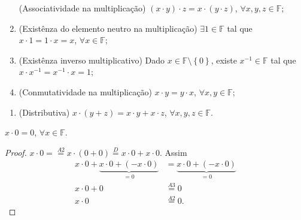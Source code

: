 \begin{definition}[Corpo]
\begin{enumerate}[label={(M\arabic*)},leftmargin=0em,itemindent=*]
		      (Associatividade na multiplicação)
		      $\left(x\cdot y\right)\cdot z=x\cdot\left(y\cdot z\right)$,
		      $\forall x,y,z\in\mathbb{F}$;


		\item\label{multiplicação:2}

		      (Existênza do elemento neutro na multiplicação)
		      $\exists 1\in\mathbb{F}$ tal que $x\cdot 1=1\cdot x=x$,
		      $\forall x\in\mathbb{F}$;

		\item\label{multiplicação:3}

		      (Existênza inverso multiplicativo)
		      Dado $x\in\mathbb{F}\setminus\left\{0\right\}$,
		      existe $x^{-1}\in\mathbb{F}$ tal que
		      $x\cdot x^{-1}=x^{-1}\cdot x=1$;

		\item\label{multiplicação:4}

		      (Conmutatividade na multiplicação)
		      $x\cdot y=y\cdot x$, $\forall x,y\in\mathbb{F}$;
	\end{enumerate}

	\begin{enumerate}[label={(D)},leftmargin=0em,itemindent=*]
		\item\label{distributiva}

		      (Distributiva)
		      $x\cdot\left(y+z\right)=x\cdot y+x\cdot z$,
		      $\forall x,y,z\in\mathbb{F}$.
	\end{enumerate}
\end{definition}

\begin{proposition}
	$x\cdot0=0$, $\forall x\in\mathbb{F}$.
\end{proposition}

\begin{proof}
	\begin{math}
		x\cdot0=
		\overset{A2}{=}
		x\cdot\left(0+0\right)
		\overset{D}{=}
		x\cdot0+x\cdot0
	\end{math}.
	Assim
	\begin{align*}
		x\cdot0+
		\underbrace{x\cdot0+\left(-x\cdot0\right)}_{=0}
		        & =
		\underbrace{x\cdot0+\left(-x\cdot0\right)}_{=0} \\
		x\cdot0+
		0       & \overset{A3}{=}
		0                                               \\
		x\cdot0 & \overset{A2}{=}
		0.
	\end{align*}
\end{proof}

